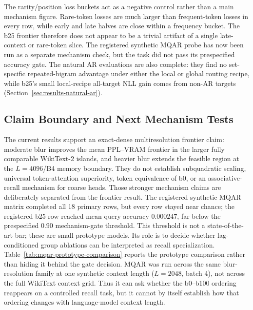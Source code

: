 \documentclass{article}
\theoremstyle{plain}
\theoremstyle{definition}
\theoremstyle{remark}
\begin{document}
The rarity/position loss buckets act as a negative control rather than a main
mechanism figure.  Rare-token losses are much larger than frequent-token losses
in every row, while early and late halves are close within a frequency bucket.
The b25 frontier therefore does not appear to be a trivial artifact of a single
late-context or rare-token slice.  The registered synthetic MQAR probe has now
been run as a separate mechanism check, but the task did not pass its
prespecified accuracy gate.  The natural AR evaluations are also complete:
they find no set-specific repeated-bigram advantage under either the local or
global routing recipe, while b25's small local-recipe all-target NLL gain comes
from non-AR targets (Section~\ref{sec:results-natural-ar}).

\subsection{Claim Boundary and Next Mechanism Tests}
\label{sec:results-claim-boundary}

The current results support an exact-dense multiresolution frontier claim:
moderate blur improves the mean PPL--VRAM frontier in the larger fully comparable
WikiText-2 islands, and heavier blur extends the feasible region at the
$L=4096$/B4 memory boundary.  They do not establish subquadratic scaling,
universal token-attention superiority, token equivalence of b0, or an
associative-recall mechanism for coarse heads.  Those stronger mechanism
claims are deliberately separated from the frontier result.  The registered
synthetic MQAR matrix completed all 18 primary rows, but every row stayed
near chance; the registered b25 row reached mean query accuracy $0.000247$, far
below the prespecified $0.90$ mechanism-gate threshold.  This threshold is not a
state-of-the-art bar; these are small prototype models.  Its role is to decide
whether lag-conditioned group ablations can be interpreted as recall
specialization.  Table~\ref{tab:mqar-prototype-comparison} reports the
prototype comparison rather than hiding it behind the gate decision.  MQAR was
run across the same blur-resolution family at one synthetic context length
($L=2048$, batch 4), not across the full WikiText context grid.  Thus it can
ask whether the b0--b100 ordering reappears on a controlled recall task, but it
cannot by itself establish how that ordering changes with language-model
context length.
\end{document}
